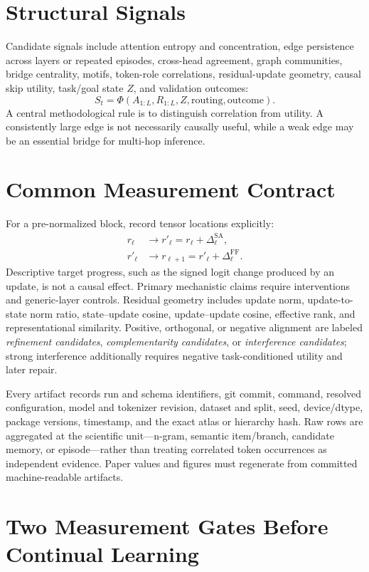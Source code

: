 \documentclass[11pt]{article}
\begin{document}
\section{Structural Signals}
Candidate signals include attention entropy and concentration, edge persistence across layers or repeated episodes, cross-head agreement, graph communities, bridge centrality, motifs, token-role correlations, residual-update geometry, causal skip utility, task/goal state $Z$, and validation outcomes:
\[
S_t=\Phi(A_{1:L},R_{1:L},Z,\mathrm{routing},\mathrm{outcome}).
\]
A central methodological rule is to distinguish correlation from utility. A consistently large edge is not necessarily causally useful, while a weak edge may be an essential bridge for multi-hop inference.

\section{Common Measurement Contract}
For a pre-normalized block, record tensor locations explicitly:
\begin{align}
r_\ell &\rightarrow r'_\ell=r_\ell+\Delta^{\mathrm{SA}}_\ell,\\
r'_\ell &\rightarrow r_{\ell+1}=r'_\ell+\Delta^{\mathrm{FF}}_\ell.
\end{align}
Descriptive target progress, such as the signed logit change produced by an update, is not a causal effect. Primary mechanistic claims require interventions and generic-layer controls. Residual geometry includes update norm, update-to-state norm ratio, state--update cosine, update--update cosine, effective rank, and representational similarity. Positive, orthogonal, or negative alignment are labeled \emph{refinement candidates}, \emph{complementarity candidates}, or \emph{interference candidates}; strong interference additionally requires negative task-conditioned utility and later repair.

Every artifact records run and schema identifiers, git commit, command, resolved configuration, model and tokenizer revision, dataset and split, seed, device/dtype, package versions, timestamp, and the exact atlas or hierarchy hash. Raw rows are aggregated at the scientific unit---n-gram, semantic item/branch, candidate memory, or episode---rather than treating correlated token occurrences as independent evidence. Paper values and figures must regenerate from committed machine-readable artifacts.

\section{Two Measurement Gates Before Continual Learning}
\end{document}
